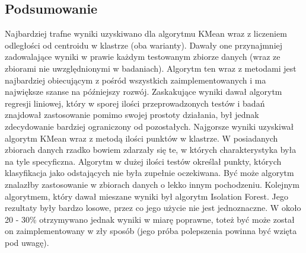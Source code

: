 \documentclass[eng,printmode]{mgr}
\begin{document}
\subsection{Podsumowanie}
Najbardziej trafne wyniki uzyskiwano dla algorytmu KMean wraz z liczeniem odległości od centroidu w klastrze (oba warianty). Dawały one przynajmniej zadowalające wyniki w prawie każdym testowanym zbiorze danych (wraz ze zbiorami nie uwzględnionymi w badaniach). Algorytm ten wraz z metodami jest najbardziej obiecującym z pośród wszystkich zaimplementowanych i ma największe szanse na późniejszy rozwój. Zaskakujące wyniki dawał algorytm regresji liniowej, który w sporej ilości przeprowadzonych testów i badań znajdował zastosowanie pomimo swojej prostoty działania, był jednak zdecydowanie bardziej ograniczony od pozostałych. Najgorsze wyniki uzyskiwał algorytm KMean wraz z metodą ilości punktów w klastrze. W posiadanych zbiorach danych rzadko bowiem zdarzały się te, w których charakterystyka była na tyle specyficzna. Algorytm w dużej ilości testów określał punkty, których klasyfikacja jako odstających nie była zupełnie oczekiwana. Być może algorytm znalazłby zastosowanie w zbiorach danych o lekko innym pochodzeniu. Kolejnym algorytmem, który dawał mieszane wyniki był algorytm Isolation Forest. Jego rezultaty były bardzo losowe, przez co jego użycie nie jest jednoznaczne. W około 20 - 30\% otrzymywano jednak wyniki w miarę poprawne, toteż być może został on zaimplementowany w zły sposób (jego próba polepszenia powinna być wzięta pod uwagę).
\end{document}
